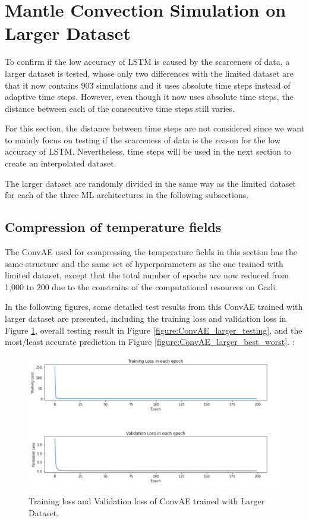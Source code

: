 \section{Mantle Convection Simulation on Larger Dataset}

To confirm if the low accuracy of LSTM is caused by the scarceness of data, a larger dataset is tested, whose only two differences with the limited dataset are that it now contains 903 simulations and it uses absolute time steps instead of adaptive time steps. However, even though it now uses absolute time steps, the distance between each of the consecutive time steps still varies.

For this section, the distance between time steps are not considered since we want to mainly focus on testing if the scarceness of data is the reason for the low accuracy of LSTM. Nevertheless, time steps will be used in the next section to create an interpolated dataset.

The larger dataset are randomly divided in the same way as the limited dataset for each of the three ML architectures in the following subsections.

\subsection{Compression of temperature fields}

The ConvAE used for compressing the temperature fields in this section has the same structure and the same set of hyperparameters as the one trained with limited dataset, except that the total number of epochs are now reduced from 1,000 to 200 due to the constrains of the computational resources on Gadi.

In the following figures, some detailed test results from this ConvAE trained with larger dataset are presented, including the training loss and validation loss in Figure \ref{figure:ConvAE_larger_losses}, overall testing result in Figure \ref{figure:ConvAE_larger_testing}, and the most/least accurate prediction in Figure \ref{figure:ConvAE_larger_best_worst}.
:

\begin{figure}[H]
    \caption{Training loss and Validation loss of ConvAE trained with Larger Dataset.}
    \includegraphics[scale=0.6]{figures/mantle_convection_images/larger_dataset/ConvAE_trainingData.png}
    \label{figure:ConvAE_larger_losses}
\end{figure}

